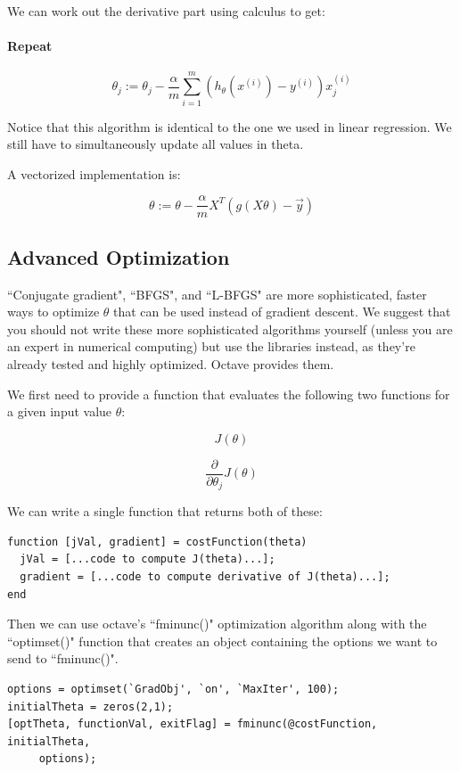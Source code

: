 \documentclass[UTF8]{article}
\begin{document}
We can work out the derivative part using calculus to get:

\paragraph{Repeat}
\[ \theta_j := \theta_j - \frac{\alpha}{m} \sum_{i=1}^m (h_\theta(x^{(i)}) - y^{(i)}) x_j^{(i)} \]

Notice that this algorithm is identical to the one we used in linear regression. We still have to simultaneously update all values in theta.

A vectorized implementation is:

\[ \theta := \theta - \frac{\alpha}{m} X^{T} (g(X \theta ) - \vec{y}) \]

\subsection{Advanced Optimization}

``Conjugate gradient", ``BFGS", and ``L-BFGS" are more sophisticated, faster ways to optimize $\theta$ that can be used instead of gradient descent. We suggest that you should not write these more sophisticated algorithms yourself (unless you are an expert in numerical computing) but use the libraries instead, as they're already tested and highly optimized. Octave provides them.

We first need to provide a function that evaluates the following two functions for a given input value $\theta$:

\[ J(\theta) \]

\[ \dfrac{\partial}{\partial \theta_j}J(\theta)\]

We can write a single function that returns both of these:

\begin{lstlisting}
function [jVal, gradient] = costFunction(theta)
  jVal = [...code to compute J(theta)...];
  gradient = [...code to compute derivative of J(theta)...];
end
\end{lstlisting}

Then we can use octave's ``fminunc()" optimization algorithm along with the ``optimset()" function that creates an object containing the options we want to send to ``fminunc()".

\begin{lstlisting}
options = optimset(`GradObj', `on', `MaxIter', 100);
initialTheta = zeros(2,1);
[optTheta, functionVal, exitFlag] = fminunc(@costFunction, initialTheta, 
     options);
\end{lstlisting}
     
\end{document}
